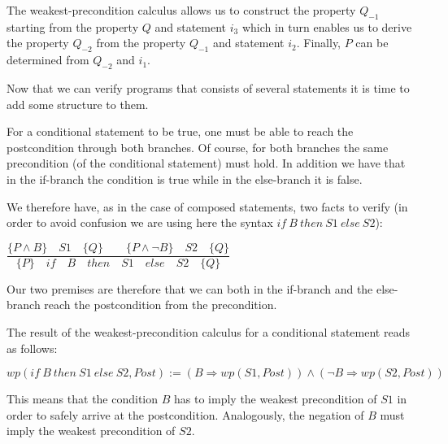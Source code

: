 \documentclass[middle]{zmdocument}
\begin{document}
The weakest-precondition calculus allows us to construct the property
$Q_{-1}$ starting from the property $Q$ and statement $i_3$ which
in turn enables us to derive the property $Q_{-2}$ from the property
$Q_{-1}$ and statement $i_2$. Finally, $P$ can be determined from
$Q_{-2}$ and $i_1$.



Now that we can verify programs that consists of several statements it
is time to add some structure to them.





For a conditional statement to be true, one must be able to reach the
postcondition through both branches. Of course, for both branches the
same precondition (of the conditional statement) must hold. In addition
we have that in the if-branch the condition is true while in the
else-branch it is false.

We therefore have, as in the case of composed statements, two facts to
verify (in order to avoid confusion we are using here the syntax
$if\ B\ then\ S1\ else\ S2$):




\begin{center}
$\dfrac{\{P \wedge B\}\quad S1\quad \{Q\} \quad \quad \{P \wedge \neg B\}\quad S2\quad \{Q\}}{\{P\}\quad if\quad B\quad then\quad S1\quad else\quad S2 \quad \{Q\}}$


\end{center}


Our two premises are therefore that we can both in the if-branch and the
else-branch reach the postcondition from the precondition.

The result of the weakest-precondition calculus for a conditional
statement reads as follows:



\begin{center}
$wp(if\ B\ then\ S1\ else\ S2 , Post) := (B \Rightarrow wp(S1, Post)) \wedge (\neg B \Rightarrow wp(S2, Post))$


\end{center}


This means that the condition $B$ has to imply the weakest
precondition of $S1$ in order to safely arrive at the postcondition.
Analogously, the negation of $B$ must imply the weakest precondition
of $S2$.



\end{document}
